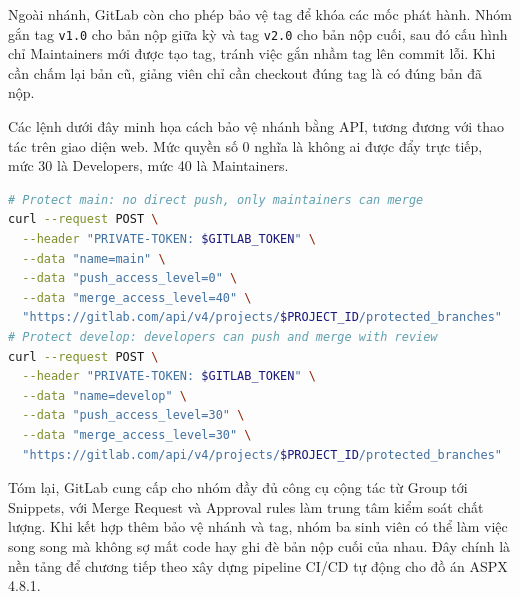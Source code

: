 Ngoài nhánh, GitLab còn cho phép bảo vệ tag để khóa các mốc phát hành.
Nhóm gắn tag \texttt{v1.0} cho bản nộp giữa kỳ và tag \texttt{v2.0} cho bản nộp cuối,
sau đó cấu hình chỉ Maintainers mới được tạo tag, tránh việc gắn nhầm tag lên commit lỗi.
Khi cần chấm lại bản cũ, giảng viên chỉ cần checkout đúng tag là có đúng bản đã nộp.

Các lệnh dưới đây minh họa cách bảo vệ nhánh bằng API, tương đương với thao tác trên giao diện web.
Mức quyền số 0 nghĩa là không ai được đẩy trực tiếp, mức 30 là Developers, mức 40 là Maintainers.

\begin{lstlisting}[language=bash, caption={Bảo vệ nhánh main và develop bằng API}, label={lst:c51-protect}]
# Protect main: no direct push, only maintainers can merge
curl --request POST \
  --header "PRIVATE-TOKEN: $GITLAB_TOKEN" \
  --data "name=main" \
  --data "push_access_level=0" \
  --data "merge_access_level=40" \
  "https://gitlab.com/api/v4/projects/$PROJECT_ID/protected_branches"
# Protect develop: developers can push and merge with review
curl --request POST \
  --header "PRIVATE-TOKEN: $GITLAB_TOKEN" \
  --data "name=develop" \
  --data "push_access_level=30" \
  --data "merge_access_level=30" \
  "https://gitlab.com/api/v4/projects/$PROJECT_ID/protected_branches"
\end{lstlisting}

Tóm lại, GitLab cung cấp cho nhóm đầy đủ công cụ cộng tác từ Group tới Snippets,
với Merge Request và Approval rules làm trung tâm kiểm soát chất lượng.
Khi kết hợp thêm bảo vệ nhánh và tag, nhóm ba sinh viên có thể làm việc song song
mà không sợ mất code hay ghi đè bản nộp cuối của nhau.
Đây chính là nền tảng để chương tiếp theo xây dựng pipeline CI/CD tự động cho đồ án ASPX 4.8.1.
